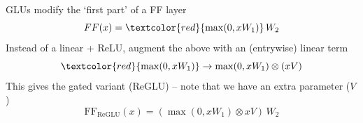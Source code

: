GLUs modify the `first part' of a FF layer
\[ FF(x) = \textcolor{red}{\max(0, xW_1)}\,W_2 \]
Instead of a linear + ReLU, augment the above with an (entrywise) linear term
\[ \textcolor{red}{\max(0, xW_1)} \rightarrow \max(0, xW_1) \otimes (xV) \]
This gives the gated variant (ReGLU) -- note that we have an extra parameter ($V$)
\[ \text{FF}_{\text{ReGLU}}(x) = (\max(0, xW_1) \otimes xV)\,W_2 \]
